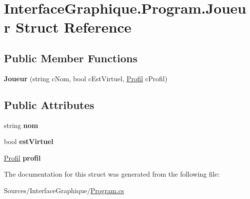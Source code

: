 \hypertarget{struct_interface_graphique_1_1_program_1_1_joueur}{}\section{Interface\+Graphique.\+Program.\+Joueur Struct Reference}
\label{struct_interface_graphique_1_1_program_1_1_joueur}
\subsection*{Public Member Functions}
\begin{DoxyCompactItemize}
\item 
{\bfseries Joueur} (string c\+Nom, bool c\+Est\+Virtuel, \hyperlink{struct_interface_graphique_1_1_profil}{Profil} c\+Profil)
\end{DoxyCompactItemize}
\subsection*{Public Attributes}
\begin{DoxyCompactItemize}
\item 
string {\bfseries nom}
\item 
bool {\bfseries est\+Virtuel}
\item 
\hyperlink{struct_interface_graphique_1_1_profil}{Profil} {\bfseries profil}
\end{DoxyCompactItemize}


The documentation for this struct was generated from the following file\+:\begin{DoxyCompactItemize}
\item 
Sources/\+Interface\+Graphique/\hyperlink{_program_8cs}{Program.\+cs}\end{DoxyCompactItemize}
